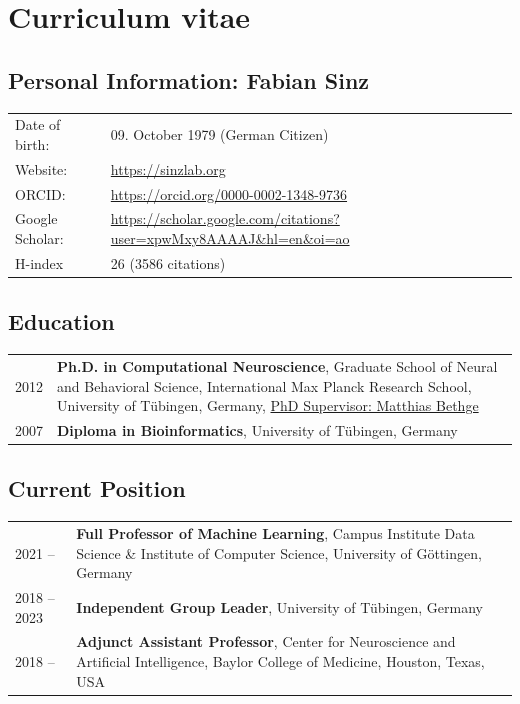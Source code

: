 \documentclass[COG,11pt]{ercgrant}
\begin{document}
\newpage
\section{Curriculum vitae}

\subsection{Personal Information: Fabian Sinz}
\begin{tabular}{p{3cm}l}
	Date of birth:         & 09. October 1979 (German Citizen)     \\
	Website:               & \url{https://sinzlab.org}     \\
	ORCID:                 &  \url{https://orcid.org/0000-0002-1348-9736}      \\
        Google Scholar:         & \url{https://scholar.google.com/citations?user=xpwMxy8AAAAJ&hl=en&oi=ao}\\
        H-index  & 26 (3586 citations)
\end{tabular}

\subsection{Education}
\begin{tabular}{p{3cm}p{12cm}}
	2012
	 & \textbf{Ph.D. in Computational Neuroscience}, Graduate School of Neural and Behavioral Science, International Max Planck Research School, University of Tübingen, Germany, \underline{PhD Supervisor: Matthias Bethge}\\
    2007 & \textbf{Diploma in Bioinformatics}, University of Tübingen, Germany
\end{tabular}

\subsection{Current Position}
\begin{tabular}{p{3cm}p{12cm}}
    2021 -- 
	 & \textbf{Full Professor of Machine Learning}, 
       Campus Institute Data Science \& Institute of Computer Science,
       University of Göttingen, Germany\\
    2018 -- 2023
      & \textbf{Independent Group Leader}, 
       University of Tübingen, Germany\\
    2018 -- 
      & \textbf{Adjunct Assistant Professor},
       Center for Neuroscience and Artificial Intelligence,
       Baylor College of Medicine, Houston, Texas, USA
\end{tabular}
\end{document}
